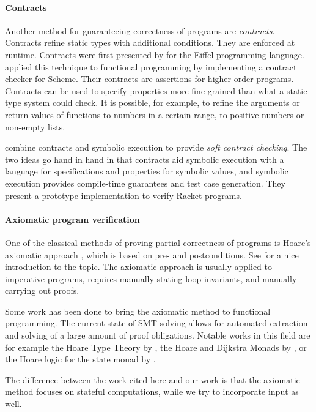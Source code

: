 \paragraph{Contracts}
Another method for guaranteeing correctness of programs are \emph{contracts}.
Contracts refine static types with additional conditions.
They are enforced at runtime.
Contracts were first presented by \citet{DBLP:journals/computer/Meyer92} for the Eiffel programming language.
\citet{FindlerF2002} applied this technique to functional programming by implementing a contract checker for Scheme.
Their contracts are assertions for higher-order programs.
Contracts can be used to specify properties more fine-grained than what a static type system could check.
It is possible, for example, to refine the arguments or return values of functions to numbers in a certain range, to positive numbers or non-empty lists.

\citet{NguyenTH2017} combine contracts and symbolic execution to provide \emph{soft contract checking}.
The two ideas go hand in hand in that contracts aid symbolic execution with a language for specifications and properties for symbolic values, and symbolic execution provides compile-time guarantees and test case generation.
They present a prototype implementation to verify Racket programs.


\paragraph{Axiomatic program verification}
One of the classical methods of proving partial correctness of programs is Hoare's axiomatic approach \cite{Hoare1969}, which is based on pre- and postconditions.
See \citet{NielsonN1992} for a nice introduction to the topic.
The axiomatic approach is usually applied to imperative programs, requires manually stating loop invariants, and manually carrying out proofs.

Some work has been done to bring the axiomatic method to functional programming.
The current state of SMT solving allows for automated extraction and solving of a large amount of proof obligations.
Notable works in this field are for example the Hoare Type Theory by \citet{NanevskiMB2006}, the Hoare and Dijkstra Monads by \citet{NanevskiMSGB08, SwamyWSCL2013}, or the Hoare logic for the state monad by \citet{Swierstra2009}.

The difference between the work cited here and our work is that the axiomatic method focuses on stateful computations, while we try to incorporate input as well.
